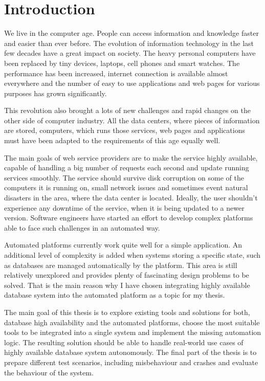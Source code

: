 \documentclass[
  digital, %
  twoside, %
  table,   %
  lof,     %
  lot,     %
]{fithesis3}
\begin{document}
\chapter{Introduction}
We live in the computer age. People can access information and knowledge faster and easier than ever before. The evolution of information technology in the last few decades have a great impact on society. The heavy personal computers have been replaced by tiny devices, laptops, cell phones and smart watches. The performance has been increased, internet connection is available almost everywhere and the number of easy to use applications and web pages for various purposes has grown significantly.

This revolution also brought a lots of new challenges and rapid changes on the other side of computer industry. All the data centers, where pieces of information are stored, computers, which runs those services, web pages and applications must have been adapted to the requirements of this age equally well.

The main goals of web service providers are to make the service highly available, capable of handling a big number of requests each second and update running services smoothly. The service should survive disk corruption on some of the computers it is running on, small network issues and sometimes event natural disasters in the area, where the data center is located. Ideally, the user shouldn't experience any downtime of the service, when it is being updated to a newer version. Software engineers have started an effort to develop complex platforms able to face such challenges in an automated way.

Automated platforms currently work quite well for a simple application. An additional level of complexity is added when systems storing a specific state, such as databases are managed automatically by the platform. This area is still relatively unexplored and provides plenty of fascinating design problems to be solved. That is the main reason why I have chosen integrating highly available database system into the automated platform as a topic for my thesis.

The main goal of this thesis is to explore existing tools and solutions for both, database high availability and the automated platforms, choose the most suitable tools to be integrated into a single system and implement the missing automation logic. The resulting solution should be able to handle real-world use cases of highly available database system autonomously. The final part of the thesis is to prepare different test scenarios, including misbehaviour and crashes and evaluate the behaviour of the system.
\end{document}
